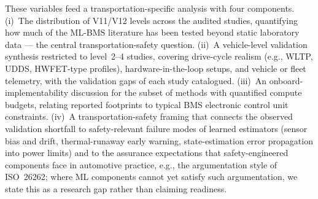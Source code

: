 These variables feed a transportation-specific analysis with four
components. (i)~The distribution of V11/V12 levels across the audited
studies, quantifying how much of the ML-BMS literature has been tested
beyond static laboratory data --- the central transportation-safety
question. (ii)~A vehicle-level validation synthesis restricted to
level~2--4 studies, covering drive-cycle realism (e.g., WLTP, UDDS,
HWFET-type profiles), hardware-in-the-loop setups, and vehicle or
fleet telemetry, with the validation gaps of each study catalogued.
(iii)~An onboard-implementability discussion for the subset of methods
with quantified compute budgets, relating reported footprints to
typical BMS electronic control unit constraints. (iv)~A
transportation-safety framing that connects the observed validation
shortfall to safety-relevant failure modes of learned estimators
(sensor bias and drift, thermal-runaway early warning, state-estimation
error propagation into power limits) and to the assurance expectations
that safety-engineered components face in automotive practice, e.g.,
the argumentation style of ISO~26262; where ML components cannot yet
satisfy such argumentation, we state this as a research gap rather than
claiming readiness.

